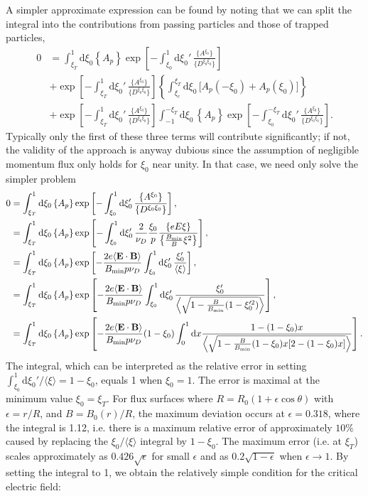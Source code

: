 \documentclass[11pt,a4paper]{article}
\newcommand{\rd}{\ensuremath{\mathrm{d}}}
\newcommand{\sub}[1]{\ensuremath{_{\text{#1}}}}
\renewcommand{\b}[1]{\ensuremath{ {\bf #1 } }}
\begin{document}
\newpage
A simpler approximate expression can be found by noting that we can split the integral into the contributions from passing particles and those of trapped particles,
\begin{align}
0 &= \int_{\xi_T}^1\rd \xi_0 \left\{  A_p   \right\} \exp \left[-\int_{\xi_0}^1\rd \xi_0' \,\frac{\{A^{\xi_0}\}}{\{D^{\xi_0\xi_0}\}} \right]\nonumber \\
&+  \exp \left[-\int_{\xi_T}^1\rd \xi_0' \,\frac{\{A^{\xi_0}\}}{\{D^{\xi_0\xi_0}\}} \right]\left\{\int_{\xi_c}^{\xi_T}\rd \xi_0 \, \bigl[ A_p(-\xi_0) + A_p(\xi_0) \bigr] \right\}\nonumber \\
& +  \exp \left[-\int_{\xi_T}^1\rd \xi_0' \,\frac{\{A^{\xi_0}\}}{\{D^{\xi_0\xi_0}\}} \right] \int_{-1}^{-\xi_T} \rd \xi_0  \, \left\{ A_p \right\} \exp \left[-\int_{\xi_0}^{-\xi_T}\rd \xi_0' \,\frac{\{A^{\xi_0}\}}{\{D^{\xi_0\xi_0}\}} \right].
\end{align}
Typically only the first of these three terms will contribute significantly; if not, the validity of the approach is anyway dubious since the assumption of negligible momentum flux only holds for $\xi_0$ near unity. In that case, we need only solve the simpler problem
\begin{align}
0 &= \int_{\xi_T}^1\rd \xi_0 \left\{ A_p   \right\} \exp \left[-\int_{\xi_0}^1\rd \xi_0' \,\frac{\{A^{\xi_0}\}}{\{D^{\xi_0\xi_0}\}} \right], \nonumber \\
&=  \int_{\xi_T}^1\rd \xi_0 \left\{ A_p   \right\} \exp \left[-\int_{\xi_0}^1\rd \xi_0' \,\frac{2}{\nu_D} \frac{\xi_0}{p} \frac{\{eE\xi \}}{\left\{\frac{B\sub{min}}{B}\xi^2\right\}} \right], \nonumber \\
&= \int_{\xi_T}^1\rd \xi_0 \left\{ A_p   \right\} \exp \left[-\frac{2e\langle \b{E}\cdot\b{B}\rangle}{B\sub{min} p \nu_D}\int_{\xi_0}^1\rd \xi_0' \,  \frac{\xi_0'}{\left\langle \xi\right\rangle} \right], \nonumber \\
&= \int_{\xi_T}^1\rd \xi_0 \left\{ A_p   \right\} \exp \left[-\frac{2e\langle \b{E}\cdot\b{B}\rangle}{B\sub{min} p \nu_D}\int_{\xi_0}^1\rd \xi_0' \,  \frac{\xi_0'}{\left\langle \sqrt{1-\frac{B}{B\sub{min}}(1-\xi_0'^2)}\right\rangle} \right], \nonumber \\
&= \int_{\xi_T}^1\rd \xi_0 \left\{ A_p   \right\}  \exp \left[-\frac{2e\langle \b{E}\cdot\b{B}\rangle}{B\sub{min} p \nu_D}(1-\xi_0)\int_0^{1} \rd x   \frac{1-(1-\xi_0)x}{\left\langle \sqrt{1-\frac{B}{B\sub{min}} (1-\xi_0)x[2-(1-\xi_0)x]}\right\rangle} \right].
\end{align}
The integral, which can be interpreted as the relative error in setting $\int_{\xi_0}^1 \rd \xi_0'/\langle \xi \rangle = 1-\xi_0$, equals 1 when $\xi_0=1$. The error is maximal at the minimum value $\xi_0 = \xi_T$. For flux surfaces where $R = R_0 (1+\epsilon \cos\theta)$ with $\epsilon=r/R$, and $B = B_0(r)/R$, the maximum deviation occurs at $\epsilon=0.318$, where the integral is 1.12, i.e. there is a maximum relative error of approximately $10\%$ caused by replacing the $\xi_0 / \langle \xi \rangle$ integral by $1-\xi_0$. The maximum error (i.e. at $\xi_T$) scales approximately as $0.426\sqrt{\epsilon}$ for small $\epsilon$ and as $0.2\sqrt{1-\epsilon}$ when $\epsilon \to 1$. By setting the integral to 1, we obtain the relatively simple condition for the critical electric field:
\end{document}
